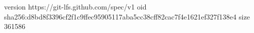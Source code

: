 version https://git-lfs.github.com/spec/v1
oid sha256:d8bd8f3396cf2f1c9ffec95905117aba5cc38cff82cac7f4e1621ef327f138e4
size 361586
